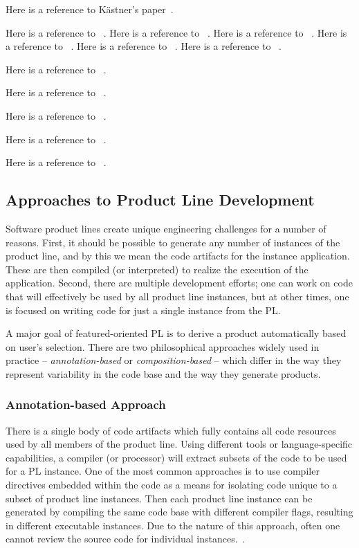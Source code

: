 Here is a reference to K\"{a}stner's paper~\cite{Kastner:2012}.

Here is a reference to ~\cite{leich2005tool}.
Here is a reference to ~\cite{proksch2014tool}.
Here is a reference to ~\cite{7203038}.
Here is a reference to ~\cite{Sayre:2005:UMA:1082983.1083277}.
Here is a reference to ~\cite{Setyautami:2016:UPD:2934466.2934479}.
Here is a reference to ~\cite{Sousa:2016:EFM:2934466.2934475}.

Here is a reference to ~\cite{Arcaini:2017:ARV:3106195.3106206}.

Here is a reference to ~\cite{Vasilevskiy:2016:TRP:2934466.2934484}.

Here is a reference to ~\cite{Kuhn:2015:CPC:2791060.2791092}.

Here is a reference to ~\cite{Schaefer:2010:DPS:1885639.1885647}.

Here is a reference to ~\cite{Apel:2008:AFF:1428476.1428480}.


\subsection{Approaches to Product Line Development}

Software product lines create unique engineering challenges for a number
of reasons. First, it should be possible to generate any number of
instances of the product line, and by this we mean the code artifacts
for the instance application. These are then compiled (or interpreted)
to realize the execution of the application. Second, there are multiple
development efforts; one can work on code that will effectively be used
by all product line instances, but at other times, one is focused on
writing code for just a single instance from the PL.

A major goal of featured-oriented PL is to derive a product
automatically based on user’s selection. There are two philosophical
approaches widely used in practice -- \textit{annotation-based} or 
\textit{composition-based} -- which differ in the way they represent
variability in the code base and the way they generate products.

\subsubsection{Annotation-based Approach}

There is a single body of code artifacts which fully contains all code
resources used by all members of the product line. Using different tools
or language-specific capabilities, a compiler (or processor) will
extract subsets of the code to be used for a PL instance. One of the
most common approaches is to use compiler directives embedded within the
code as a means for isolating code unique to a subset of product line
instances. Then each product line instance can be generated by compiling
the same code base with different compiler flags, resulting in different
executable instances. Due to the nature of this approach, often one
cannot review the source code for individual
instances.~\cite{Apel:2013:FSP:2541773}.


